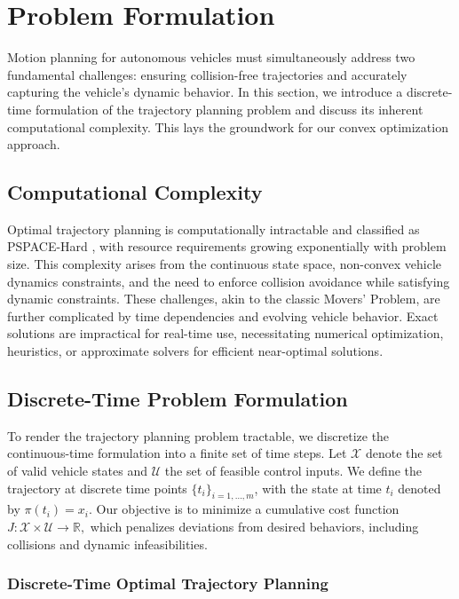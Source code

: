 \section{Problem Formulation} \label{sec:convex_discrete_time_optimization}

Motion planning for autonomous vehicles must simultaneously address two fundamental challenges: ensuring collision-free trajectories and accurately
capturing the vehicle's dynamic behavior.
In this section, we introduce a discrete-time formulation of the trajectory planning problem and discuss its inherent computational complexity.
This lays the groundwork for our convex optimization approach.

\subsection{Computational Complexity} \label{subsec:complexity}

Optimal trajectory planning is computationally intractable and classified as PSPACE-Hard \cite{reif_complexity_1979}, with resource requirements
growing exponentially with problem size.
This complexity arises from the continuous state space, non-convex vehicle dynamics constraints, and the need to enforce collision avoidance while
satisfying dynamic constraints.
These challenges, akin to the classic Movers' Problem, are further complicated by time dependencies and evolving vehicle behavior.
Exact solutions are impractical for real-time use, necessitating numerical optimization, heuristics, or approximate solvers for efficient
near-optimal solutions.

\subsection{Discrete-Time Problem Formulation}

To render the trajectory planning problem tractable, we discretize the continuous-time formulation into a finite set of time steps.
Let $\mathcal{X}$ denote the set of valid vehicle states and $\mathcal{U}$ the set of feasible control inputs.
We define the trajectory at discrete time points $\{t_i\}_{i=1,\dots ,m}$, with the state at time $t_i$ denoted by $\pi(t_i) = x_i$.
Our objective is to minimize a cumulative cost function $ J: \mathcal{X} \times \mathcal{U} \to \mathbb{R}, $ which penalizes deviations from desired
behaviors, including collisions and dynamic infeasibilities.

\subsubsection{Discrete-Time Optimal Trajectory Planning}\label{subsubsec:discrete_time_optimal_trajectory_planning}

